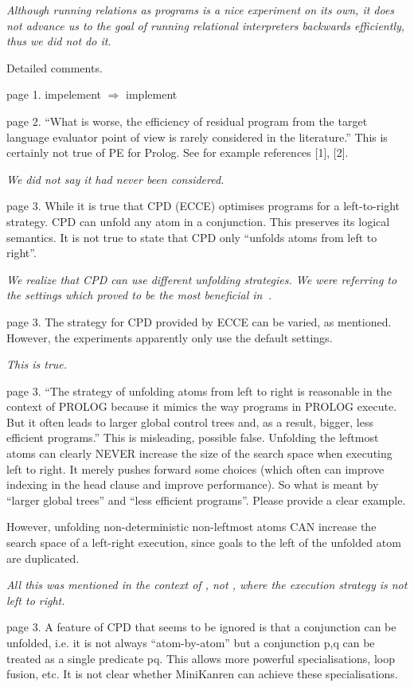 \emph{Although running \mk relations as \pro programs is a nice experiment on its own, it does not advance us to the goal of running relational interpreters backwards efficiently, thus we did not do it.}

Detailed comments.

page 1. impelement $\Rightarrow$ implement

page 2.  ``What is worse, the efficiency of residual program from the target language evaluator point of view is rarely considered in the literature.'' This is certainly not true of PE for Prolog.  See for example references [1], [2].

\emph{We did not say it had never been considered.}

page 3.  While it is true that CPD (ECCE) optimises programs for a left-to-right strategy. CPD can unfold any atom in a conjunction.  This preserves its logical semantics.  It is not true to state that CPD only ``unfolds atoms from left to right''.

\emph{We realize that CPD can use different unfolding strategies. We were referring to the settings which proved to be the most beneficial in~\cite{leuschel1997advanced}.}

page 3.  The strategy for CPD provided by ECCE can be varied, as mentioned.  However, the experiments apparently only use the default settings.

\emph{This is true.}

page 3. ``The strategy of unfolding atoms from left to right is reasonable in the context of PROLOG because it mimics the way programs in PROLOG execute. But it often leads to larger global control trees and, as a result, bigger, less efficient programs.''  This is misleading, possible false.  Unfolding the leftmost atoms can clearly NEVER increase the size of the search space when executing left to right.  It merely pushes forward some choices (which often can improve indexing in the head clause and improve performance). So what is meant by ``larger global trees'' and ``less efficient programs''. Please provide a clear example.

However, unfolding non-deterministic non-leftmost atoms CAN increase the search space of a left-right execution, since goals to the left of the unfolded atom are duplicated.

\emph{All this was mentioned in the context of \mk, not \pro, where the execution strategy is not left to right.}


page 3. A feature of CPD that seems to be ignored is that a conjunction can be unfolded, i.e. it is not always ``atom-by-atom'' but a conjunction p,q can be treated as a single predicate pq.  This allows more powerful specialisations, loop fusion, etc.  It is not clear whether MiniKanren can achieve these specialisations.


